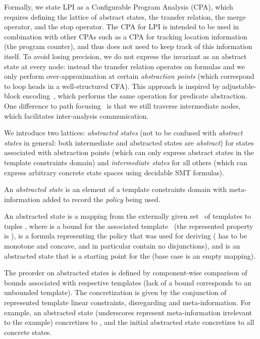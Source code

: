 \documentclass{llncs}
\newcommand{\cfa}{\textsc{CFA}\xspace}
\begin{document}
Formally, we state LPI as a Configurable Program Analysis (\textsc{CPA}),
which requires defining the lattice of abstract
states, the transfer relation, the merge operator, and the stop operator.
The \textsc{CPA} for LPI is intended to be used in combination with other CPAs
such as a \textsc{CPA} for tracking location information (the program counter),
and thus does not need to keep track of this information itself.
To avoid losing precision, we do not express the invariant
as an abstract state at every node: instead the transfer
relation operates on formulas and we only perform over-approximation at certain
\emph{abstraction points} (which correspond to loop heads in a well-structured
\textsc{\cfa}).
This approach is inspired by adjustable-block
encoding~\cite{adjustable_block_encoding}, which performs the same operation for
predicate abstraction.
One difference to path focusing~\cite{path_focusing} is that we still traverse
intermediate nodes, which facilitates inter-analysis communication.

We introduce two lattices: \emph{abstracted states} (not to be confused
    with \emph{abstract states} in general: both intermediate and abstracted
    states are \emph{abstract}) for states
associated with abstraction points (which can only express abstract states in the template
constraints domain)
and \emph{intermediate states} for all others
(which can express arbitrary concrete state spaces using decidable SMT formulas).

An \emph{abstracted state} is an element of a template
constraints domain with meta-information added to record the \emph{policy} being used.

\begin{definition}
    An abstracted state is a mapping from the externally given set~ of templates
    to tuples , where  is a bound for the
    associated template~ (the represented property is ),
     is a formula representing the policy that was used for deriving 
    ( has to be monotone and concave, and in particular contain
    no disjunctions), and  is an abstracted state that
    is a starting point for the 
    (base case is an empty mapping).
    \label{def:abstracted_state}
\end{definition}

The preorder on abstracted states is defined by component-wise
comparison
of bounds associated with respective templates (lack of a bound
corresponds to an unbounded template).
The concretization is given by the
conjunction of represented template linear constraints, disregarding
 and  meta-information.
For example, an abstracted state  (underscores
represent meta-information irrelevant to the example) concretizes to
\mbox{},
and the initial abstracted state  concretizes to all concrete states.
\end{document}
